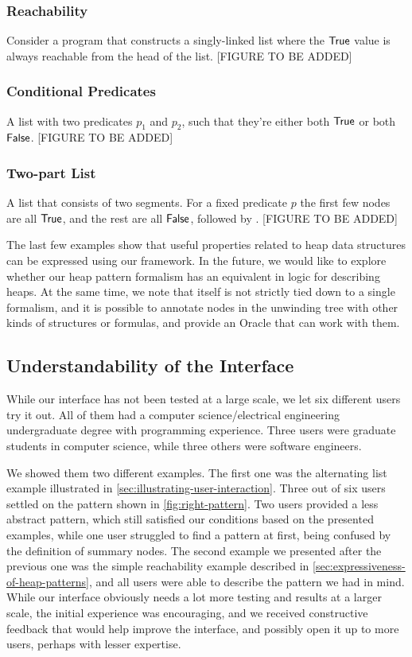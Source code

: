 \subsubsection{Reachability}
Consider a program that constructs a singly-linked list where the $\mathsf{True}$ value is always
reachable from the head of the list. [FIGURE TO BE ADDED]

\subsubsection{Conditional Predicates}
A list with two predicates $p_1$ and $p_2$, such that they're either both $\mathsf{True}$ or both
$\mathsf{False}$. [FIGURE TO BE ADDED]

\subsubsection{Two-part List}
A list that consists of two segments. For a fixed predicate $p$ the first few nodes are
all $\mathsf{True}$, and the rest are all $\mathsf{False}$, followed by \nilconst. [FIGURE TO BE ADDED]

The last few examples show that useful properties related to heap data structures can be
expressed using our framework. In the future, we would like to explore whether our heap
pattern formalism has an equivalent in logic for describing heaps. At the same time, we
note that \verifier itself is not strictly tied down to a single formalism, and it is
possible to annotate nodes in the unwinding tree with other kinds of structures or
formulas, and provide an Oracle that can work with them.

\subsection{Understandability of the Interface}
\label{sec:understandability-of-interface}
While our interface has not been tested at a large scale, we let six different users try
it out. All of them had a computer science/electrical engineering undergraduate degree
with programming experience. Three users were graduate students in computer science,
while three others were software engineers.

We showed them two different examples. The first one was the alternating list example
illustrated in \autoref{sec:illustrating-user-interaction}. Three out of six users settled
on the pattern shown in \autoref{fig:right-pattern}. Two users provided a less abstract
pattern, which still satisfied our conditions based on the presented examples, while one
user struggled to find a pattern at first, being confused by the definition of summary
nodes. The second example we presented after the previous one was the simple reachability
example described in \autoref{sec:expressiveness-of-heap-patterns}, and all users were
able to describe the pattern we had in mind. While our interface obviously needs a lot
more testing and results at a larger scale, the initial experience was encouraging, and
we received constructive feedback that would help improve the interface, and possibly
open it up to more users, perhaps with lesser expertise.

